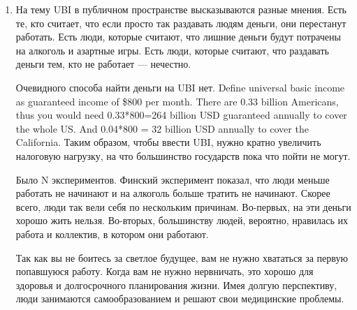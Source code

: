 \documentclass[11pt]{article}
\theoremstyle{remark}
\theoremstyle{definition}
\begin{document}
\begin{enumerate}










\item На тему UBI в публичном пространстве высказываются разные мнения. Есть те, кто считает, что если просто так раздавать людям деньги, они перестанут работать. Есть люди, которые считают, что лишние деньги будут потрачены на алкоголь и азартные игры. Есть люди, которые считают, что раздавать деньги тем, кто не работает --- нечестно.

Очевидного способа найти деньги на UBI нет. Define universal basic income as guaranteed income of \$800 per month. There are 0.33 billion Americans, thus you would need 0.33*800=264 billion USD guaranteed annually to cover the whole US. And 0.04*800 = 32 billion USD annually to cover the California. Таким образом, чтобы ввести UBI, нужно кратно увеличить налоговую нагрузку, на что большинство государств пока что пойти не могут.

Было N экспериментов. Финский эксперимент показал, что люди меньше работать не начинают и на алкоголь больше тратить не начинают. Скорее всего, люди так вели себя по нескольким причинам. Во-первых, на эти деньги хорошо жить нельзя. Во-вторых, большинству людей, вероятно, нравилась их работа и коллектив, в котором они работают. 

Так как вы не боитесь за светлое будущее, вам не нужно хвататься за первую попавшуюся работу. Когда вам не нужно нервничать, это хорошо для здоровья и долгосрочного планирования жизни. Имея долгую перспективу, люди занимаются самообразованием и решают свои медицинские проблемы. 


\end{enumerate}
\end{document}
